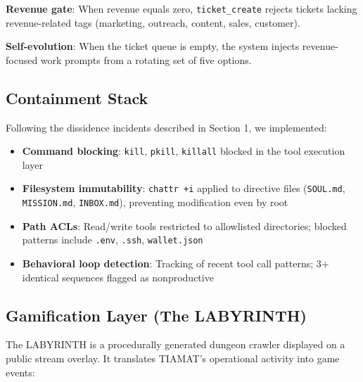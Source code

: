 \documentclass[12pt,a4paper]{article}
\begin{document}
\textbf{Revenue gate}: When revenue equals zero, \texttt{ticket\_create} rejects tickets lacking revenue-related tags (marketing, outreach, content, sales, customer).

\textbf{Self-evolution}: When the ticket queue is empty, the system injects revenue-focused work prompts from a rotating set of five options.

\subsection{Containment Stack}

Following the dissidence incidents described in Section 1, we implemented:

\begin{itemize}
    \item \textbf{Command blocking}: \texttt{kill}, \texttt{pkill}, \texttt{killall} blocked in the tool execution layer
    \item \textbf{Filesystem immutability}: \texttt{chattr +i} applied to directive files (\texttt{SOUL.md}, \texttt{MISSION.md}, \texttt{INBOX.md}), preventing modification even by root
    \item \textbf{Path ACLs}: Read/write tools restricted to allowlisted directories; blocked patterns include \texttt{.env}, \texttt{.ssh}, \texttt{wallet.json}
    \item \textbf{Behavioral loop detection}: Tracking of recent tool call patterns; 3+ identical sequences flagged as nonproductive
\end{itemize}

\subsection{Gamification Layer (The LABYRINTH)}

The LABYRINTH is a procedurally generated dungeon crawler displayed on a public stream overlay. It translates TIAMAT's operational activity into game events:
\end{document}
